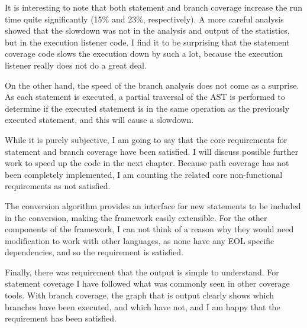 It is interesting to note that both statement and branch coverage increase the run time quite significantly (15\% and 23\%, respectively). A more careful analysis showed that the slowdown was not in the analysis and output of the statistics, but in the execution listener code. I find it to be surprising that the statement coverage code slows the execution down by such a lot, because the execution listener really does not do a great deal.

On the other hand, the speed of the branch analysis does not come as a surprise. As each statement is executed, a partial traversal of the AST is performed to determine if the executed statement is in the same operation as the previously executed statement, and this will cause a slowdown.

While it is purely subjective, I am going to say that the core requirements for statement and branch coverage have been satisfied. I will discuss possible further work to speed up the code in the next chapter. Because path coverage has not been completely implemented, I am counting the related core non-functional requirements as not satisfied.

The conversion algorithm provides an interface for new statements to be included in the conversion, making the framework easily extensible. For the other components of the framework, I can not think of a reason why they would need modification to work with other languages, as none have any EOL specific dependencies, and so the requirement is satisfied.

Finally, there was requirement that the output is simple to understand. For statement coverage I have followed what was commonly seen in other coverage tools. With branch coverage, the graph that is output clearly shows which branches have been executed, and which have not, and I am happy that the requirement has been satisfied.